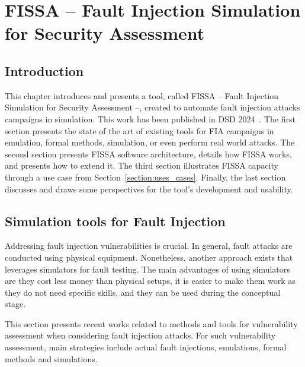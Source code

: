 \chapter{FISSA -- Fault Injection Simulation for Security Assessment}
\label{chapter:fissa}
\minitoc

\section{Introduction}
This chapter introduces and presents a tool, called FISSA -- Fault Injection Simulation for Security Assessment --, created to automate fault injection attacks campaigns in simulation.
This work has been published in DSD 2024~\cite{PLG-24-dsd}.
The first section presents the state of the art of existing tools for FIA campaigns in emulation, formal methods, simulation, or even perform real world attacks.
The second section presents FISSA software architecture, details how FISSA works, and presents how to extend it.
The third section illustrates FISSA capacity through a use case from Section~\ref{section:uses_cases}.
Finally, the last section discusses and draws some perspectives for the tool's development and usability.

\section{Simulation tools for Fault Injection}

Addressing fault injection vulnerabilities is crucial. In general, fault attacks are conducted using physical equipment. Nonetheless, another approach exists that leverages simulators for fault testing. The main advantages of using simulators are they cost less money than physical setups, it is easier to make them work as they do not need specific skills, and they can be used during the conceptual stage.

This section presents recent works related to methods and tools for vulnerability assessment when considering fault injection attacks. For such vulnerability assessment, main strategies include actual fault injections, emulations, formal methods and simulations.

